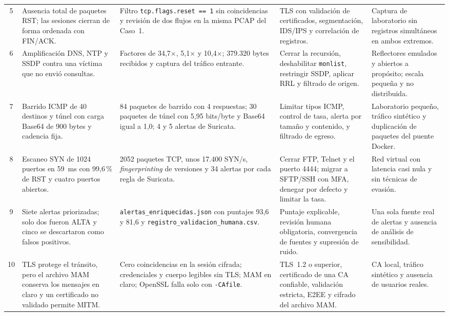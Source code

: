 \begin{table}[H]
\begin{tabularx}{\textwidth}{@{}c >{\raggedright\arraybackslash}p{} Y >{\raggedright\arraybackslash}p{0.22\textwidth} >{\raggedright\arraybackslash}p{0.16\textwidth}@{}}
		5 & Ausencia total de paquetes RST; las sesiones cierran de forma ordenada con FIN/ACK. & Filtro \texttt{tcp.flags.reset == 1} sin coincidencias y revisión de dos flujos en la misma PCAP del Caso~1. & TLS con validación de certificados, segmentación, IDS/IPS y correlación de registros. & Captura de laboratorio sin registros simultáneos en ambos extremos. \\
		6 & Amplificación DNS, NTP y SSDP contra una víctima que no envió consultas. & Factores de 34,7$\times$, 5,1$\times$ y 10,4$\times$; 379.320 bytes recibidos y captura del tráfico entrante. & Cerrar la recursión, deshabilitar \texttt{monlist}, restringir SSDP, aplicar RRL y filtrado de origen. & Reflectores emulados y abiertos a propósito; escala pequeña y no distribuida. \\
		7 & Barrido ICMP de 40 destinos y túnel con carga Base64 de 900 bytes y cadencia fija. & 84 paquetes de barrido con 4 respuestas; 30 paquetes de túnel con 5,95 bits/byte y Base64 igual a 1,0; 4 y 5 alertas de Suricata. & Limitar tipos ICMP, control de tasa, alerta por tamaño y contenido, y filtrado de egreso. & Laboratorio pequeño, tráfico sintético y duplicación de paquetes del puente Docker. \\
		8 & Escaneo SYN de 1024 puertos en 59~ms con 99,6\,\% de RST y cuatro puertos abiertos. & 2052 paquetes TCP, unos 17.400 SYN/s, \emph{fingerprinting} de versiones y 34 alertas por cada regla de Suricata. & Cerrar FTP, Telnet y el puerto 4444; migrar a SFTP/SSH con MFA, denegar por defecto y limitar la tasa. & Red virtual con latencia casi nula y sin técnicas de evasión. \\
		9 & Siete alertas priorizadas; solo dos fueron ALTA y cinco se descartaron como falsos positivos. & \texttt{alertas\_enriquecidas.json} con puntajes 93,6 y 81,6 y \texttt{registro\_validacion\_humana.csv}. & Puntaje explicable, revisión humana obligatoria, convergencia de fuentes y supresión de ruido. & Una sola fuente real de alertas y ausencia de análisis de sensibilidad. \\
		10 & TLS protege el tránsito, pero el archivo MAM conserva los mensajes en claro y un certificado no validado permite MITM. & Cero coincidencias en la sesión cifrada; credenciales y cuerpo legibles sin TLS; MAM en claro; OpenSSL falla solo con \texttt{-CAfile}. & TLS~1.2 o superior, certificado de una CA confiable, validación estricta, E2EE y cifrado del archivo MAM. & CA local, tráfico sintético y ausencia de usuarios reales. \\
		\bottomrule
	\end{tabularx}
\end{table}

